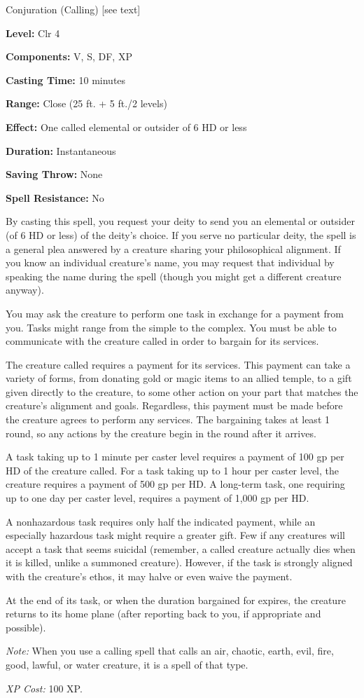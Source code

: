 \label{spell:Lesser Planar Ally}

Conjuration (Calling) [see text]

\textbf{Level:} Clr 4

\textbf{Components:} V, S, DF, XP

\textbf{Casting Time:} 10 minutes

\textbf{Range:} Close (25 ft. + 5 ft./2 levels)

\textbf{Effect:} One called elemental or outsider of 6 HD or less

\textbf{Duration:} Instantaneous

\textbf{Saving Throw:} None

\textbf{Spell Resistance:} No

By casting this spell, you request your deity to send you an elemental or outsider 
(of 6 HD or less) of the deity's choice. If you serve no particular deity, the 
spell is a general plea answered by a creature sharing your philosophical alignment. 
If you know an individual creature's name, you may request that individual by speaking 
the name during the spell (though you might get a different creature anyway).

You may ask the creature to perform one task in exchange for a payment from you. 
Tasks might range from the simple to the complex. You must be able to communicate 
with the creature called in order to bargain for its services.

The creature called requires a payment for its services. This payment can take 
a variety of forms, from donating gold or magic items to an allied temple, to a 
gift given directly to the creature, to some other action on your part that matches 
the creature's alignment and goals. Regardless, this payment must be made before 
the creature agrees to perform any services. The bargaining takes at least 1 round, 
so any actions by the creature begin in the round after it arrives.

A task taking up to 1 minute per caster level requires a payment of 100 gp per 
HD of the creature called. For a task taking up to 1 hour per caster level, the 
creature requires a payment of 500 gp per HD. A long-term task, one requiring up 
to one day per caster level, requires a payment of 1,000 gp per HD.

A nonhazardous task requires only half the indicated payment, while an especially 
hazardous task might require a greater gift. Few if any creatures will accept a 
task that seems suicidal (remember, a called creature actually dies when it is 
killed, unlike a summoned creature). However, if the task is strongly aligned with 
the creature's ethos, it may halve or even waive the payment. 

At the end of its task, or when the duration bargained for expires, the creature 
returns to its home plane (after reporting back to you, if appropriate and possible).

\textit{Note:} When you use a calling spell that calls an air, chaotic, earth, 
evil, fire, good, lawful, or water creature, it is a spell of that type.

\textit{XP Cost:} 100 XP.

